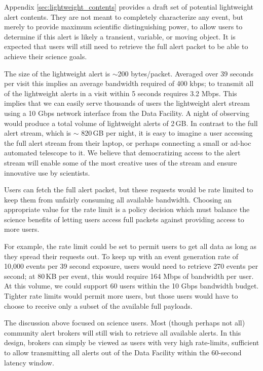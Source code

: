 \documentclass[DM,authoryear,toc]{lsstdoc}
\begin{document}
Appendix \ref{sec:lightweight_contents} provides a draft set of potential lightweight alert contents.
They are not meant to completely characterize any event, but merely to provide maximum scientific distinguishing power, to allow users to determine if this alert is likely a transient, variable, or moving object.
It is expected that users will still need to retrieve the full alert packet to be able to achieve their science goals.

The size of the lightweight alert is $\sim$200 bytes/packet.
Averaged over 39 seconds per visit this implies an average bandwidth required of 400 kbps; to transmit all of the lightweight alerts in a visit within 5 seconds requires 3.2 Mbps.
This implies that we can easily serve thousands of users the lightweight alert stream using a 10 Gbps network interface from the Data Facility.
A night of observing would produce a total volume of lightweight alerts of 2\,GB.
In contrast to the full alert stream, which is $\sim$ 820\,GB per night, it is easy to imagine a user accessing the full alert stream from their laptop, or perhaps connecting a small or ad-hoc automated telescope to it.
We believe that democratizing access to the alert stream will enable some of the most creative uses of the stream and ensure innovative use by scientists.

Users can fetch the full alert packet, but these requests would be rate limited to keep them from unfairly consuming all available bandwidth.
Choosing an appropriate value for the rate limit is a policy decision which must balance the science benefits of letting users access full packets against providing access to more users.

For example, the rate limit could be set to permit users to get all data as long as they spread their requests out.
To keep up with an event generation rate of 10,000 events per 39 second exposure, users would need to retrieve 270 events per second; at 80\,KB per event, this would require 164 Mbps of bandwidth per user.
At this volume, we could support 60 users within the 10 Gbps bandwidth budget.
Tighter rate limits would permit more users, but those users would have to choose to receive only a subset of the available full payloads.

The discussion above focused on science users.
Most (though perhaps not all) community alert brokers will still wish to retrieve all available alerts.
In this design, brokers can simply be viewed as users with very high rate-limits, sufficient to allow transmitting all alerts out of the Data Facility within the 60-second latency window.
\end{document}
